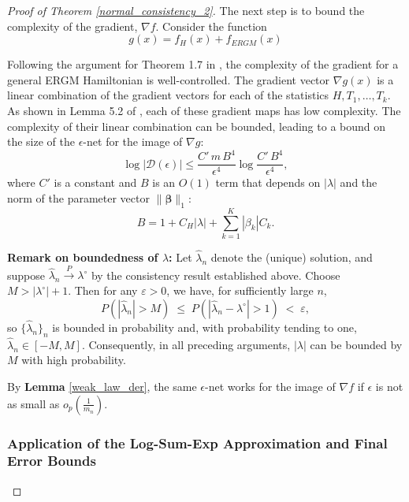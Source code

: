 \documentclass[12pt]{article}
\numberwithin{equation}{section}
\def\bbeta{\boldsymbol{\beta}}
\begin{document}
\begin{proof}[Proof of Theorem \ref{normal_consistency_2}]
The next step is to bound the complexity of the gradient, $\nabla f$. Consider the function
\[g(x) = f_H(x) + f_{ERGM}(x)\]

Following the argument for Theorem 1.7 in \cite{chatterjee2016nonlinear}, the complexity of the gradient for a general ERGM Hamiltonian is well-controlled. The gradient vector $\nabla g(x)$ is a linear combination of the gradient vectors for each of the statistics $H, T_1, \dots, T_k$. As shown in Lemma 5.2 of \cite{chatterjee2016nonlinear}, each of these gradient maps has low complexity. The complexity of their linear combination can be bounded, leading to a bound on the size of the $\epsilon$-net for the image of $\nabla g$:
\[
\log |\mathcal{D}(\epsilon)| \le \frac{C'\,m\,B^4}{\epsilon^4}\log\frac{C'\,B^4}{\epsilon^4},
\]
where $C'$ is a constant and $B$ is an $O(1)$ term that depends on $|\lambda|$ and the norm of the parameter vector $\|\bbeta\|_1$:
\[
B = 1 + C_H|\lambda| + \sum_{k=1}^K |\beta_k| C_k.
\]

\textbf{Remark on boundedness of \(\lambda\): } Let $\hat{\lambda}_n$ denote the (unique) solution, and suppose $\hat{\lambda}_n \xrightarrow{P} \lambda^{\circ}$ by the consistency result established above. Choose $M > |\lambda^{\circ}| + 1$. Then for any $\varepsilon>0$, we have, for sufficiently large \(n\),
\[
P\!\left(|\hat{\lambda}_n| > M\right)
\;\le\;
P\!\left(|\hat{\lambda}_n - \lambda^{\circ}| > 1\right)
\;<\; \varepsilon,
\]
so $\{\hat{\lambda}_n\}_{n}$ is bounded in probability and, with probability tending to one, $\hat{\lambda}_n \in [-M,M]$. Consequently, in all preceding arguments, $\lvert\lambda\rvert$ can be bounded by \(M\) with high probability.
\vspace{0.5cm}



By \textbf{Lemma} \ref{weak_law_der}, the same \(\epsilon\)-net works for the image of \(\nabla f\) if \(\epsilon \) is not as small as \(o_p(\frac{1}{m_n})\). 

\subsubsection*{Application of the Log-Sum-Exp Approximation and Final Error Bounds}


\end{proof}
\end{document}
